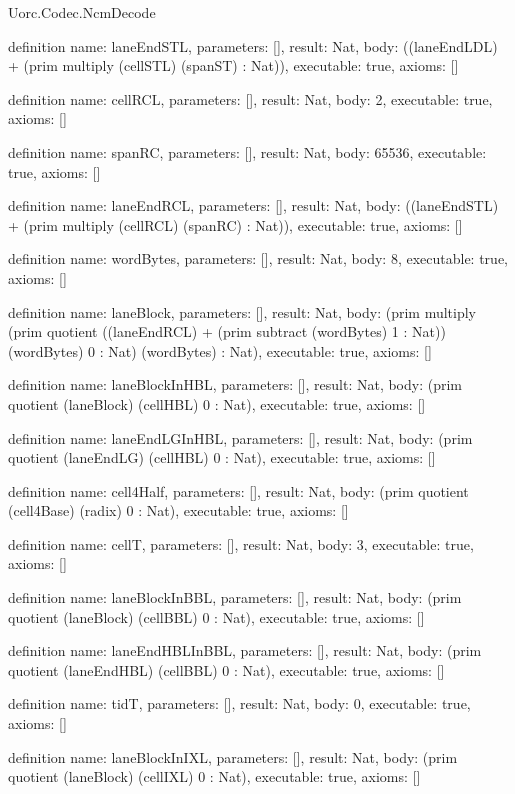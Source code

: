 \begin{lexlean}{Uorc.Codec.NcmDecode}
\begin{semanticmodule}
definition{
  name: laneEndSTL,
  parameters: [],
  result: Nat,
  body: ((laneEndLDL) + (prim multiply (cellSTL) (spanST) : Nat)),
  executable: true,
  axioms: []
}

definition{
  name: cellRCL,
  parameters: [],
  result: Nat,
  body: 2,
  executable: true,
  axioms: []
}

definition{
  name: spanRC,
  parameters: [],
  result: Nat,
  body: 65536,
  executable: true,
  axioms: []
}

definition{
  name: laneEndRCL,
  parameters: [],
  result: Nat,
  body: ((laneEndSTL) + (prim multiply (cellRCL) (spanRC) : Nat)),
  executable: true,
  axioms: []
}

definition{
  name: wordBytes,
  parameters: [],
  result: Nat,
  body: 8,
  executable: true,
  axioms: []
}

definition{
  name: laneBlock,
  parameters: [],
  result: Nat,
  body: (prim multiply (prim quotient ((laneEndRCL) + (prim subtract (wordBytes) 1 : Nat)) (wordBytes) 0 : Nat) (wordBytes) : Nat),
  executable: true,
  axioms: []
}

definition{
  name: laneBlockInHBL,
  parameters: [],
  result: Nat,
  body: (prim quotient (laneBlock) (cellHBL) 0 : Nat),
  executable: true,
  axioms: []
}

definition{
  name: laneEndLGInHBL,
  parameters: [],
  result: Nat,
  body: (prim quotient (laneEndLG) (cellHBL) 0 : Nat),
  executable: true,
  axioms: []
}

definition{
  name: cell4Half,
  parameters: [],
  result: Nat,
  body: (prim quotient (cell4Base) (radix) 0 : Nat),
  executable: true,
  axioms: []
}

definition{
  name: cellT,
  parameters: [],
  result: Nat,
  body: 3,
  executable: true,
  axioms: []
}

definition{
  name: laneBlockInBBL,
  parameters: [],
  result: Nat,
  body: (prim quotient (laneBlock) (cellBBL) 0 : Nat),
  executable: true,
  axioms: []
}

definition{
  name: laneEndHBLInBBL,
  parameters: [],
  result: Nat,
  body: (prim quotient (laneEndHBL) (cellBBL) 0 : Nat),
  executable: true,
  axioms: []
}

definition{
  name: tidT,
  parameters: [],
  result: Nat,
  body: 0,
  executable: true,
  axioms: []
}

definition{
  name: laneBlockInIXL,
  parameters: [],
  result: Nat,
  body: (prim quotient (laneBlock) (cellIXL) 0 : Nat),
  executable: true,
  axioms: []
}


\end{semanticmodule}
\end{lexlean}
